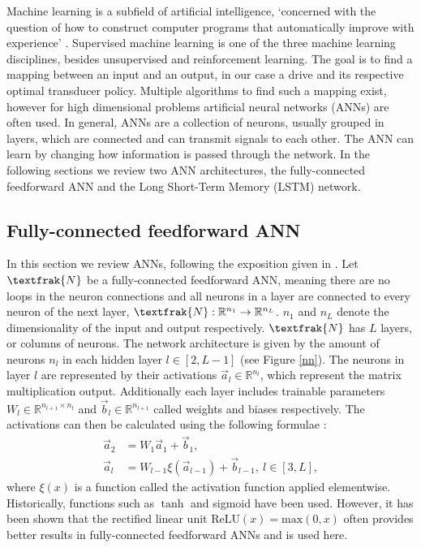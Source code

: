 Machine learning is a subfield of artificial intelligence, `concerned with the question of how to construct computer programs that automatically improve with experience' \cite{Mitchell97}.
Supervised machine learning is one of the three machine learning disciplines, besides unsupervised and reinforcement learning.
The goal is to find a mapping between an input and an output, in our case a drive and its respective optimal transducer policy.
Multiple algorithms to find such a mapping exist, however for high dimensional problems artificial neural networks (ANNs) are often used.
In general, ANNs are a collection of neurons, usually grouped in layers, which are connected and can transmit signals to each other.
The ANN can learn by changing how information is passed through the network.
In the following sections we review two ANN architectures, the fully-connected feedforward ANN and the Long Short-Term Memory (LSTM) network.

\subsection{Fully-connected feedforward ANN}
In this section we review ANNs, following the exposition given in \cite{lu2020dying}.
Let $\textfrak{N}$ be a fully-connected feedforward ANN, meaning there are no loops in the neuron connections and all neurons in a layer are connected to every neuron of the next layer, $\textfrak{N}: \mathbb{R}^{n_1} \to \mathbb{R}^{n_L}$. $n_1$ and $n_L$ denote the dimensionality of the input and output respectively. 
$\textfrak{N}$ has $L$ layers, or columns of neurons.
The network architecture is given by the amount of neurons $n_l$ in each hidden layer $l \in [2, L - 1]$ (see Figure \ref{nn}).
The neurons in layer $l$ are represented by their activations $\vec{a}_l \in \mathbb{R}^{n_l}$, which represent the matrix multiplication output. Additionally each layer includes trainable parameters $W_l \in \mathbb{R}^{n_{l+1} \times n_{l}}$ and $\vec{b}_l \in \mathbb{R}^{n_{l+1}}$ called weights and biases respectively.
The activations can then be calculated using the following formulae \cite{TN_libero_mab2)53517}:
\begin{align*}
	\vec{a}_2 & = W_1 \vec{a}_1 + \vec{b}_1, \\
	\vec{a}_l & = W_{l-1} \xi(\vec{a}_{l-1}) + \vec{b}_{l-1}, \ l \in [3, L],
\end{align*}
where $\xi(x)$ is a function called the activation function applied elementwise. Historically, functions such as $\tanh$ and sigmoid have been used. However, it has been shown \cite{Maas2013RectifierNI, krizhevsky} that the rectified linear unit $\mathrm{ReLU}(x) = \mathrm{max}(0, x)$ often provides better results in fully-connected feedforward ANNs and is used here.

